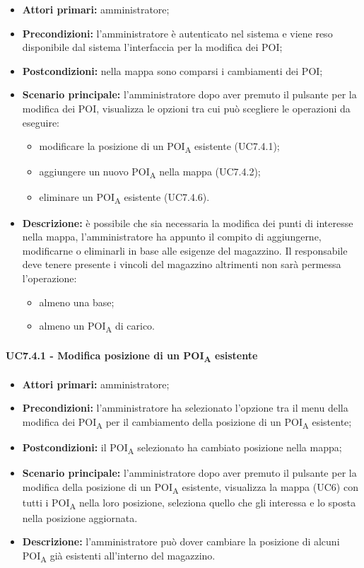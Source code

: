 \begin{itemize}
	\item 	\textbf{Attori primari:} amministratore;
	\item 	\textbf{Precondizioni:} l'amministratore è autenticato nel sistema e viene reso disponibile dal sistema l'interfaccia per la modifica dei POI;
	\item 	\textbf{Postcondizioni:} nella mappa sono comparsi i cambiamenti dei POI; 
	\item 	\textbf{Scenario principale:} l'amministratore dopo aver premuto il pulsante per la modifica dei POI, visualizza le opzioni tra cui può scegliere le operazioni da eseguire:
	\begin{itemize}
		\item modificare la posizione di un \acrshort{POI}\textsubscript{A} esistente (UC7.4.1);
		\item aggiungere un nuovo \acrshort{POI}\textsubscript{A} nella mappa (UC7.4.2);
		\item eliminare un \acrshort{POI}\textsubscript{A} esistente (UC7.4.6).
	\end{itemize}
	\item 	\textbf{Descrizione:} è possibile che sia necessaria la modifica dei punti di interesse nella mappa, l'amministratore ha appunto il compito di aggiungerne, modificarne o eliminarli in base alle esigenze del magazzino. Il responsabile deve tenere presente i vincoli del magazzino altrimenti non sarà permessa l'operazione:
	\begin{itemize}
		\item almeno una base;
		\item almeno un \acrshort{POI}\textsubscript{A} di carico.
	\end{itemize}
\end{itemize}

\paragraph{UC7.4.1 - Modifica posizione di un \acrshort{POI}\textsubscript{A} esistente}

\begin{itemize}
	\item 	\textbf{Attori primari:} amministratore;
	\item 	\textbf{Precondizioni:} l'amministratore ha selezionato l'opzione tra il menu della modifica dei \acrshort{POI}\textsubscript{A} per il cambiamento della posizione di un \acrshort{POI}\textsubscript{A} esistente;
	\item 	\textbf{Postcondizioni:} il \acrshort{POI}\textsubscript{A} selezionato ha cambiato posizione nella mappa; 
	\item 	\textbf{Scenario principale:} l'amministratore dopo aver premuto il pulsante per la modifica della posizione di un \acrshort{POI}\textsubscript{A} esistente, visualizza la mappa (UC6) con tutti i \acrshort{POI}\textsubscript{A} nella loro posizione, seleziona quello che gli interessa e lo sposta nella posizione aggiornata.
	\item 	\textbf{Descrizione:} l'amministratore può dover cambiare la posizione di alcuni \acrshort{POI}\textsubscript{A} già esistenti all'interno del magazzino.
\end{itemize}
